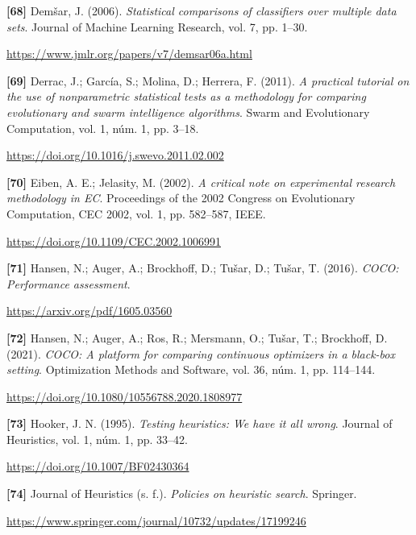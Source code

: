 \documentclass[11pt,a4paper]{article}
\newcommand{\referencia}[1]{\par\addvspace{0.8\baselineskip}\noindent\hangindent=1.1cm\hangafter=1 #1\par\nopagebreak}
\begin{document}
\begin{samepage}
\referencia{\textbf{[68]} Dem{\v{s}}ar, J. (2006). \textit{Statistical comparisons of classifiers over multiple data sets}. Journal of Machine Learning Research, vol. 7, pp. 1--30.}
 {\small\url{https://www.jmlr.org/papers/v7/demsar06a.html}}\par
\end{samepage}
\begin{samepage}
\referencia{\textbf{[69]} Derrac, J.; Garc{\'i}a, S.; Molina, D.; Herrera, F. (2011). \textit{A practical tutorial on the use of nonparametric statistical tests as a methodology for comparing evolutionary and swarm intelligence algorithms}. Swarm and Evolutionary Computation, vol. 1, núm. 1, pp. 3--18.}
 {\small\url{https://doi.org/10.1016/j.swevo.2011.02.002}}\par
\end{samepage}
\begin{samepage}
\referencia{\textbf{[70]} Eiben, A. E.; Jelasity, M. (2002). \textit{A critical note on experimental research methodology in {EC}}. Proceedings of the 2002 Congress on Evolutionary Computation, {CEC} 2002, vol. 1, pp. 582--587, IEEE.}
 {\small\url{https://doi.org/10.1109/CEC.2002.1006991}}\par
\end{samepage}
\begin{samepage}
\referencia{\textbf{[71]} Hansen, N.; Auger, A.; Brockhoff, D.; Tu{\v{s}}ar, D.; Tu{\v{s}}ar, T. (2016). \textit{{COCO}: Performance assessment}.}
 {\small\url{https://arxiv.org/pdf/1605.03560}}\par
\end{samepage}
\begin{samepage}
\referencia{\textbf{[72]} Hansen, N.; Auger, A.; Ros, R.; Mersmann, O.; Tu{\v{s}}ar, T.; Brockhoff, D. (2021). \textit{{COCO}: A platform for comparing continuous optimizers in a black-box setting}. Optimization Methods and Software, vol. 36, núm. 1, pp. 114--144.}
 {\small\url{https://doi.org/10.1080/10556788.2020.1808977}}\par
\end{samepage}
\begin{samepage}
\referencia{\textbf{[73]} Hooker, J. N. (1995). \textit{Testing heuristics: We have it all wrong}. Journal of Heuristics, vol. 1, núm. 1, pp. 33--42.}
 {\small\url{https://doi.org/10.1007/BF02430364}}\par
\end{samepage}
\begin{samepage}
\referencia{\textbf{[74]} {Journal of Heuristics} (s. f.). \textit{Policies on heuristic search}. Springer.}
 {\small\url{https://www.springer.com/journal/10732/updates/17199246}}\par
\end{samepage}
\end{document}
